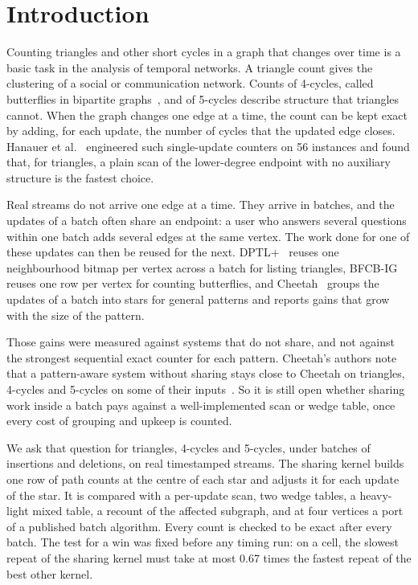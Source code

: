 
\section{Introduction}
\label{sec:intro}

Counting triangles and other short cycles in a graph that changes over time is a basic task in the analysis of temporal networks.
A triangle count gives the clustering of a social or communication network. Counts of 4-cycles, called butterflies in bipartite graphs~\cite{bfcb}, and of 5-cycles describe structure that triangles cannot.
When the graph changes one edge at a time, the count can be kept exact by adding, for each update, the number of cycles that the updated edge closes.
Hanauer et al.~\cite{hanauer-dyncount} engineered such single-update counters on 56 instances and found that, for triangles, a plain scan of the lower-degree endpoint with no auxiliary structure is the fastest choice.

Real streams do not arrive one edge at a time.
They arrive in batches, and the updates of a batch often share an endpoint: a user who answers several questions within one batch adds several edges at the same vertex.
The work done for one of these updates can then be reused for the next.
DPTL+~\cite{dptl} reuses one neighbourhood bitmap per vertex across a batch for listing triangles, BFCB-IG~\cite{bfcb} reuses one row per vertex for counting butterflies, and Cheetah~\cite{cheetah} groups the updates of a batch into stars for general patterns and reports gains that grow with the size of the pattern.

Those gains were measured against systems that do not share, and not against the strongest sequential exact counter for each pattern.
Cheetah's authors note that a pattern-aware system without sharing stays close to Cheetah on triangles, 4-cycles and 5-cycles on some of their inputs~\cite{cheetah}.
So it is still open whether sharing work inside a batch pays against a well-implemented scan or wedge table, once every cost of grouping and upkeep is counted.

We ask that question for triangles, 4-cycles and 5-cycles, under batches of insertions and deletions, on real timestamped streams.
The sharing kernel builds one row of path counts at the centre of each star and adjusts it for each update of the star.
It is compared with a per-update scan, two wedge tables, a heavy-light mixed table, a recount of the affected subgraph, and at four vertices a port of a published batch algorithm.
Every count is checked to be exact after every batch.
The test for a win was fixed before any timing run: on a cell, the slowest repeat of the sharing kernel must take at most 0.67 times the fastest repeat of the best other kernel.

